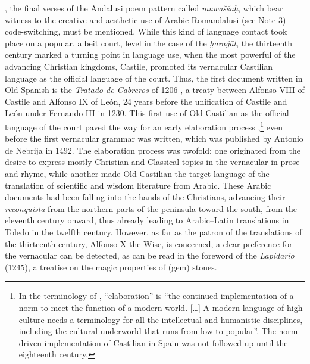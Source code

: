 \documentclass[output=paper]{langscibook}
\begin{document}
\citep{corriente_poesidialectal_1997,corriente_romania_2008}, the final verses of the Andalusi poem pattern called \textit{muwaššaḥ}, which bear witness to the creative and aesthetic use of Arabic-Romandalusi (see Note 3) code-switching, must be mentioned. While this kind of language contact took place on a popular, albeit court, level in the case of the \textit{ḫaraǧāt}, the thirteenth century marked a turning point in language use, when the most powerful of the advancing Christian kingdoms, Castile, promoted its vernacular Castilian language as the official language of the court. Thus, the first document written in Old Spanish is the \textit{Tratado de Cabreros} of 1206 \citep{wright_tratado_2000}, a treaty between Alfonso VIII of Castile and Alfonso IX of León, 24 years before the unification of Castile and León under Fernando III in 1230.
 This first use of Old Castilian as the official language of the court paved the way for an early elaboration process \citep[273]{haugen_implementation_1983},\footnote{In the terminology of \citet[273]{haugen_implementation_1983}, “elaboration” is “the continued implementation of a norm to meet the function of a modern world. […] A modern language of high culture needs a terminology for all the intellectual and humanistic disciplines, including the cultural underworld that runs from low to popular”. The norm-driven implementation of Castilian in Spain was not followed up until the eighteenth century.} even before the first vernacular grammar was written, which was published by Antonio de Nebrija in 1492. The elaboration process was twofold; one originated from the desire to express mostly Christian and Classical topics in the vernacular in prose and rhyme, while another made Old Castilian the target language of the translation of scientific and wisdom literature from Arabic. These Arabic documents had been falling into the hands of the Christians, advancing their \textit{reconquista} from the northern parts of the peninsula toward the south, from the eleventh century onward, thus already leading to Arabic–Latin translations in Toledo in the twelfth century. However, as far as the patron of the translations of the thirteenth century, Alfonso X the Wise, is concerned, a clear preference for the vernacular can be detected, as can be read in the foreword of the \textit{Lapidario} (1245), a treatise on the magic properties of (gem) stones.
\end{document}
